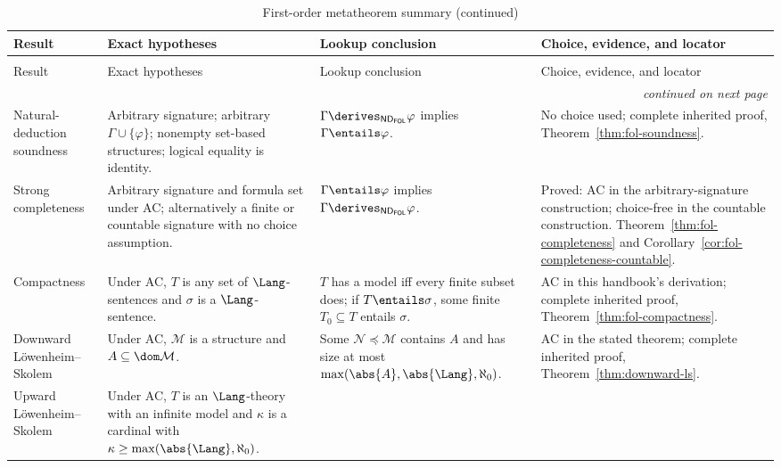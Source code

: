 \begin{landscape}
\begingroup\scriptsize\setlength{\tabcolsep}{3pt}
\begin{longtable}{@{}p{1.15in}p{2.15in}p{2.25in}p{1.65in}@{}}
\caption{First-order metatheorem summary.}
\label{tab:p02-fol-metatheorems}\\
\toprule
Result & Exact hypotheses & Lookup conclusion & Choice, evidence, and locator \\ \midrule
\endfirsthead
\caption[]{First-order metatheorem summary (continued)}\\
\toprule
Result & Exact hypotheses & Lookup conclusion & Choice, evidence, and locator \\ \midrule
\endhead
\midrule\multicolumn{4}{r}{\emph{continued on next page}}\\
\endfoot
\endlastfoot
Natural-deduction soundness &
Arbitrary signature; arbitrary \(\Gamma\cup\{\varphi\}\); nonempty set-based
structures; logical equality is identity. &
\(\Gamma\derives_{\mathsf{ND}_{\mathsf{FOL}}}\varphi\) implies
\(\Gamma\entails\varphi\). &
No choice used; complete inherited proof,
Theorem~\ref{thm:fol-soundness}. \\
\addlinespace
Strong completeness &
Arbitrary signature and formula set under AC; alternatively a finite or
countable signature with no choice assumption. &
\(\Gamma\entails\varphi\) implies
\(\Gamma\derives_{\mathsf{ND}_{\mathsf{FOL}}}\varphi\). &
Proved: AC in the arbitrary-signature construction; choice-free in the
countable construction.  Theorem~\ref{thm:fol-completeness} and
Corollary~\ref{cor:fol-completeness-countable}. \\
\addlinespace
Compactness &
Under AC, \(T\) is any set of \(\Lang\)-sentences and \(\sigma\) is a
\(\Lang\)-sentence. &
\(T\) has a model iff every finite subset does; if \(T\entails\sigma\), some
finite \(T_0\subseteq T\) entails \(\sigma\). &
AC in this handbook's derivation; complete inherited proof,
Theorem~\ref{thm:fol-compactness}. \\
\addlinespace
Downward L\"owenheim--Skolem &
Under AC, \(\mathcal M\) is a structure and \(A\subseteq\dom\mathcal M\). &
Some \(\mathcal N\preccurlyeq\mathcal M\) contains \(A\) and has size at most
\(\max(\abs{A},\abs{\Lang},\aleph_0)\). &
AC in the stated theorem; complete inherited proof,
Theorem~\ref{thm:downward-ls}. \\
\addlinespace
Upward L\"owenheim--Skolem &
Under AC, \(T\) is an \(\Lang\)-theory with an infinite model and
\(\kappa\) is a cardinal with \(\kappa\geq\max(\abs{\Lang},\aleph_0)\). &

\end{longtable}
\end{landscape}
